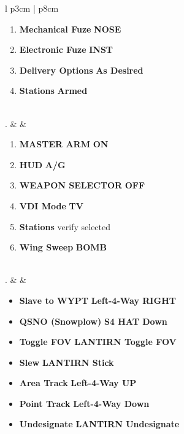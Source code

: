\documentclass[8pt,usenames,dvipsnames,twoside]{article}
\begin{document}
\begin{center}
\begin{longtable}{l p{3cm} | p{8cm}}
\begin{minipage}[t]{\linewidth}
\begin{enumerate}[label=(\alph*)]
						\item \textbf{Mechanical Fuze} \dotfill \textbf{NOSE}
						\item \textbf{Electronic Fuze} \dotfill \textbf{INST}
						\item \textbf{Delivery Options} \dotfill \textbf{As Desired}
						\item \textbf{Stations} \dotfill \textbf{Armed}
					\end{enumerate}
				\end{minipage} \\
				. &  & 
				\begin{minipage}[t]{\linewidth}
					\vspace{-7pt}
					\begin{enumerate}[label=(\alph*)]
						\item \textbf{MASTER ARM} \dotfill \textbf{ON}
						\item \textbf{HUD} \dotfill \textbf{A/G}
						\item \textbf{WEAPON SELECTOR} \dotfill \textbf{OFF}
						\item \textbf{VDI Mode} \dotfill \textbf{TV}
						\item \textbf{Stations} \dotfill verify selected
						\item \textbf{Wing Sweep} \dotfill \textbf{BOMB}
					\end{enumerate} 
				\end{minipage} \\
				. &  & 
				\begin{minipage}[t]{\linewidth}
					\vspace{-7pt}
					\begin{itemize}
						\item \textbf{Slave to WYPT} \dotfill \textbf{Left-4-Way RIGHT}
						\item \textbf{QSNO (Snowplow)} \dotfill \textbf{S4 HAT Down}
						\item \textbf{Toggle FOV} \dotfill \textbf{LANTIRN Toggle FOV}
						\item \textbf{Slew} \dotfill \textbf{LANTIRN Stick}
						\item \textbf{Area Track} \dotfill \textbf{Left-4-Way UP}
						\item \textbf{Point Track} \dotfill \textbf{Left-4-Way Down}
						\item \textbf{Undesignate} \dotfill \textbf{LANTIRN Undesignate}
					\end{itemize}
				\end{minipage} \\

\end{longtable}
\end{center}
\end{document}
